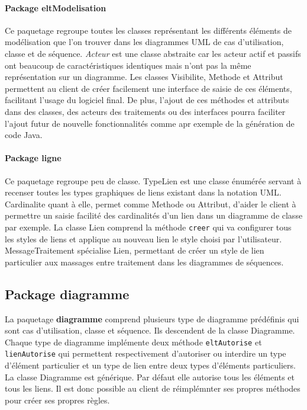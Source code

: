 \documentclass[12pt,a4paper,openany]{report}
\begin{document}
	\paragraph{Package eltModelisation} Ce paquetage regroupe toutes les classes représentant les différents éléments de 
	modélisation que l'on trouver dans les diagrammes UML de cas d'utilisation, classe et de séquence. \textit{Acteur} 
	est une classe abstraite car les acteur actif et passifs ont beaucoup de caractéristiques identiques mais n'ont pas 
	la même représentation sur un diagramme. Les classes Visibilite, Methode et Attribut permettent au client de créer 
	facilement une interface de saisie de ces éléments, facilitant l'usage du logiciel final. De plus, l'ajout de ces 
	méthodes et attributs dans des classes, des acteurs des traitements ou des interfaces pourra faciliter l'ajout futur 
	de nouvelle fonctionnalités comme apr exemple de la génération de code Java.
	\paragraph{Package ligne} Ce paquetage regroupe peu de classe. TypeLien est une classe énumérée servant à recenser
	toutes les types graphiques de liens existant dans la notation UML. Cardinalite quant à elle, permet comme Methode 
	ou Attribut, d'aider le client à permettre un saisie facilité des cardinalités d'un lien dans un diagramme de classe par exemple.
	La classe Lien comprend la méthode \texttt{creer} qui va configurer tous les styles de liens et applique au nouveau lien
	le style choisi par l'utilisateur. MessageTraitement spécialise Lien, permettant de créer un style de lien particulier
	aux massages entre traitement dans les diagrammes de séquences.
	\subsection{Package diagramme}
	La paquetage \textbf{diagramme} comprend plusieurs type de diagramme prédéfinis qui sont cas d'utilisation, classe et séquence.
	Ils descendent de la classe Diagramme. Chaque type de diagramme implémente deux méthode \texttt{eltAutorise} et \texttt{lienAutorise}
	qui permettent respectivement d'autoriser ou interdire un type d'élément particulier et un type de lien entre deux types d'éléments
	particuliers. La classe Diagramme est générique. Par défaut elle autorise tous les éléments et tous les liens. Il est donc possible
	au client de réimplémnter ses propres méthodes pour créer ses propres règles.
\end{document}
